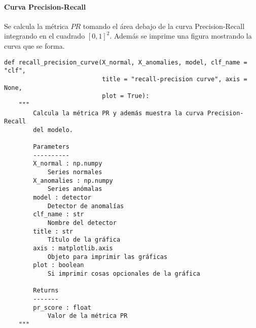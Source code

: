 \paragraph{Curva Precision-Recall}

Se calcula la métrica $PR$ tomando el área debajo de la curva Precision-Recall integrando en el cuadrado $[0, 1]^2$. Además se imprime una figura mostrando la curva que se forma.

\begin{lstlisting}
def recall_precision_curve(X_normal, X_anomalies, model, clf_name = "clf",
                           title = "recall-precision curve", axis = None,
                           plot = True):
    """
        Calcula la métrica PR y además muestra la curva Precision-Recall
        del modelo.

        Parameters
        ----------
        X_normal : np.numpy
            Series normales
        X_anomalies : np.numpy
            Series anómalas
        model : detector
            Detector de anomalías
        clf_name : str
            Nombre del detector
        title : str
            Título de la gráfica
        axis : matplotlib.axis
            Objeto para imprimir las gráficas
        plot : boolean
            Si imprimir cosas opcionales de la gráfica

        Returns
        -------
        pr_score : float
            Valor de la métrica PR
    """
\end{lstlisting}

\endinput
